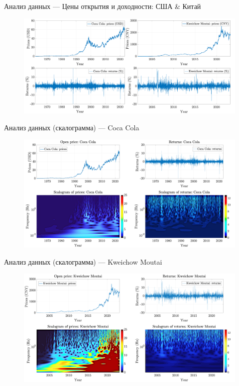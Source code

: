 \documentclass[11pt, aspectratio= 169]{beamer}
\begin{document}
	\begin{frame}{Анализ данных --- Цены открытия и доходности: США \& Китай}
		\begin{figure}[H]
			\includegraphics[width= 14cm]{visual_insight.png}
		\end{figure}
	\end{frame}

	\begin{frame}{Анализ данных (скалограмма) --- Coca Cola}
		\begin{figure}[H]
			\includegraphics[width= 14cm]{scalogram_insights_us.png}
		\end{figure}
	\end{frame}

	\begin{frame}{Анализ данных (скалограмма) --- Kweichow Moutai}
		\begin{figure}[H]
			\includegraphics[width= 14cm]{scalogram_insights_china.png}
		\end{figure}
	\end{frame}
\end{document}
